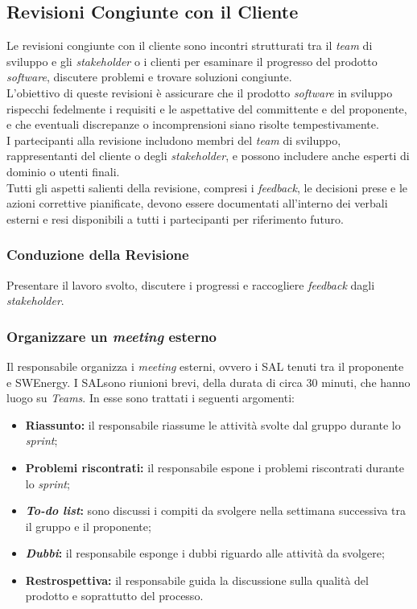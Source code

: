 \subsection{Revisioni Congiunte con il Cliente}
Le revisioni congiunte con il cliente sono incontri strutturati tra il \textit{team} di
sviluppo e gli \textit{stakeholder} o i clienti per esaminare il progresso del
prodotto \textit{software}, discutere problemi e trovare soluzioni congiunte.\\
L'obiettivo di queste revisioni è assicurare che il prodotto \textit{software}
in sviluppo rispecchi fedelmente i requisiti e le aspettative del committente e
del proponente, e che eventuali discrepanze o incomprensioni siano risolte
tempestivamente.\\
I partecipanti alla revisione includono membri del \textit{team} di sviluppo, rappresentanti del cliente o degli
\textit{stakeholder}, e possono includere anche esperti di dominio o utenti
finali.\\
Tutti gli aspetti salienti della revisione, compresi i \textit{feedback\g}, le
decisioni prese e le azioni correttive pianificate, devono essere documentati
all'interno dei verbali esterni e resi disponibili a tutti i partecipanti per
riferimento futuro.

\subsubsection{Conduzione della Revisione} 
Presentare il lavoro svolto,
	  discutere i progressi e raccogliere \textit{feedback\g} dagli
	  \textit{stakeholder}.


\subsubsection{Organizzare un \textit{meeting} esterno}
\label{organizzare-meeting-esterno}
Il responsabile organizza i \textit{meeting} esterni, ovvero i SAL\g
tenuti tra il proponente e SWEnergy.
I SAL\g sono riunioni brevi, della durata di circa 30 minuti, che hanno
luogo su \textit{Teams}. In esse
sono trattati i seguenti argomenti:
\begin{itemize}
	\item \textbf{Riassunto:} il responsabile riassume le attività svolte dal
	      gruppo durante lo \textit{sprint};

	\item \textbf{Problemi riscontrati:} il responsabile espone i problemi
	      riscontrati durante lo \textit{sprint};

	\item \textbf{\textit{To-do list}:} sono discussi i compiti da svolgere nella
	      settimana successiva tra il gruppo e il proponente;

	\item \textbf{\textit{Dubbi}:} il responsabile esponge i dubbi riguardo alle
	      attività da svolgere;

	\item \textbf{Restrospettiva:} il responsabile guida la discussione sulla
	      qualità del prodotto e soprattutto del processo.
\end{itemize}

